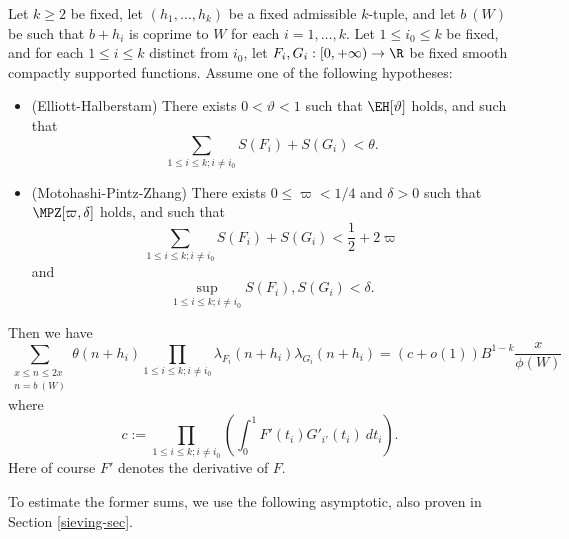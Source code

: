 \begin{theorem}\label{prime-asym}  Let $k \geq 2$ be fixed, let $(h_1,\dots,h_k)$ be a fixed admissible $k$-tuple, and let $b\ (W)$ be such that $b+h_i$ is coprime to $W$ for each $i=1,\dots,k$.  Let $1 \leq i_0 \leq k$ be fixed, and for each $1 \leq i \leq k$ distinct from $i_0$, let $F_{i}, G_{i}: [0,+\infty) \to \R$ be fixed smooth compactly supported functions.  Assume one of the following hypotheses:
\begin{itemize}
\item[(i)]  (Elliott-Halberstam) There exists $0 < \vartheta < 1$ such that $\EH[\vartheta]$ holds, and such that 
\begin{equation}\label{fg-upper}
\sum_{1 \leq i \leq k; i \neq i_0} S(F_{i}) + S(G_{i}) < \theta.
\end{equation}
\item[(ii)]  (Motohashi-Pintz-Zhang) There exists $0 \leq \varpi < 1/4$ and $\delta > 0$ such that $\MPZ[\varpi,\delta]$ holds, and such that
\begin{equation}\label{fg-upper-alt}
\sum_{1 \leq i \leq k; i \neq i_0} S(F_{i}) + S(G_{i}) < \frac{1}{2} + 2 \varpi
\end{equation}
and
\begin{equation}
\sup_{1 \leq i \leq k; i \neq i_0} S(F_{i}), S(G_{i}) < \delta.
\end{equation}
\end{itemize}
Then we have
\begin{equation}\label{theta-oo}
 \sum_{\substack{x \leq n \leq 2x\\ n = b\ (W)}} \theta(n+h_i) \prod_{1 \leq i \leq k; i \neq i_0} \lambda_{F_{i}}(n+h_{i}) \lambda_{G_{i}}(n+h_{i}) = 
(c+o(1)) B^{1-k} \frac{x}{\phi(W)}
\end{equation}
where
$$ c := \prod_{1 \leq i \leq k; i \neq i_0} \left(\int_0^1 F'(t_{i}) G'_{i'}(t_{i})\ dt_{i}\right).$$
Here of course $F'$ denotes the derivative of $F$.
\end{theorem}


To estimate the former sums, we use the following asymptotic, also proven in Section \ref{sieving-sec}.

